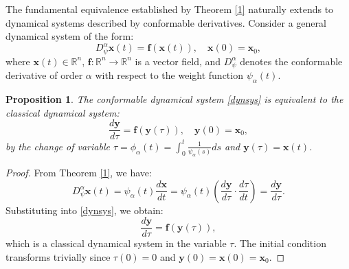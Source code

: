 \documentclass[preprint,12pt]{elsarticle}
\newtheorem{proposition}{Proposition}
\newtheorem{proof}{Proof}
\begin{document}
The fundamental equivalence established by Theorem \ref{1} naturally extends to dynamical systems described by conformable derivatives. Consider a general dynamical system of the form:
\begin{equation}\label{dynsys}
D_\psi^\alpha \mathbf{x}(t) = \mathbf{f}(\mathbf{x}(t)), \quad \mathbf{x}(0) = \mathbf{x}_0,
\end{equation}
where $\mathbf{x}(t) \in \mathbb{R}^n$, $\mathbf{f}: \mathbb{R}^n \to \mathbb{R}^n$ is a vector field, and $D_\psi^\alpha$ denotes the conformable derivative of order $\alpha$ with respect to the weight function $\psi_\alpha(t)$.

\begin{proposition}
The conformable dynamical system \eqref{dynsys} is equivalent to the classical dynamical system:
\[
\frac{d\mathbf{y}}{d\tau} = \mathbf{f}(\mathbf{y}(\tau)), \quad \mathbf{y}(0) = \mathbf{x}_0,
\]
by the change of variable $\tau = \phi_\alpha(t) = \int_0^t \frac{1}{\psi_\alpha(s)} ds$ and $\mathbf{y}(\tau) = \mathbf{x}(t)$.
\end{proposition}

\begin{proof}
From Theorem \ref{1}, we have:
\[
D_\psi^\alpha \mathbf{x}(t) = \psi_\alpha(t) \frac{d\mathbf{x}}{dt} = \psi_\alpha(t) \left( \frac{d\mathbf{y}}{d\tau} \cdot \frac{d\tau}{dt} \right) = \frac{d\mathbf{y}}{d\tau}.
\]
Substituting into \eqref{dynsys}, we obtain:
\[
\frac{d\mathbf{y}}{d\tau} = \mathbf{f}(\mathbf{y}(\tau)),
\]
which is a classical dynamical system in the variable $\tau$. The initial condition transforms trivially since $\tau(0) = 0$ and $\mathbf{y}(0) = \mathbf{x}(0) = \mathbf{x}_0$.
\end{proof}
\end{document}
